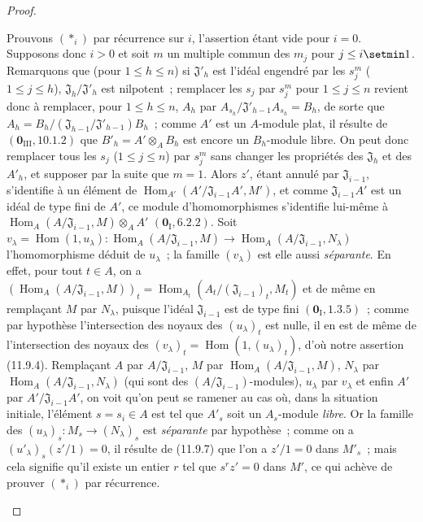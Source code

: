 \begin{proof}
\begin{enumerate}[label=(\roman*)]
  Prouvons $(*_i)$ par récurrence sur $i$, l'assertion étant vide pour $i=0$.
  Supposons donc $i>0$ et soit $m$ un multiple commun des $m_j$ pour
  $j\leq i\setmin 1$. Remarquons que (pour $1\leq h\leq n$) si
  $\mathfrak J'_h$ est l'idéal engendré par les $s_j^m$ ($1\leq j\leq h$),
  $\mathfrak J_h/\mathfrak J'_h$ est nilpotent~; remplacer les $s_j$ par
  $s_j^m$ pour $1\leq j\leq n$ revient donc à remplacer, pour
  $1\leq h\leq n$, $A_h$ par
  $A_{s_h}/\mathfrak J'_{h-1}A_{s_h}=B_h$, de sorte que
  $A_h=B_h/(\mathfrak J_{h-1}/\mathfrak J'_{h-1})B_h$~; comme $A'$ est un
  $A$-module plat, il résulte de $(\mathbf 0_{\mathrm{III}},10.1.2)$ que
  $B'_h=A'\otimes_A B_h$ est encore un $B_h$-module libre. On peut donc
  remplacer tous les $s_j$ ($1\leq j\leq n$) par $s_j^m$ sans changer les
  propriétés des $\mathfrak J_h$ et des $A'_h$, et supposer par la suite que
  $m=1$. Alors $z'$, étant annulé par $\mathfrak J_{i-1}$, s'identifie à un
  élément de
  $\operatorname{Hom}_{A'}(A'/\mathfrak J_{i-1}A',M')$, et comme
  $\mathfrak J_{i-1}A'$ est un idéal de type fini de $A'$, ce module
  d'homomorphismes s'identifie lui-même à
  $\operatorname{Hom}_A(A/\mathfrak J_{i-1},M)\otimes_A A'$
  $(\mathbf 0_{\mathrm I},6.2.2)$. Soit
  $v_\lambda=\operatorname{Hom}(1,u_\lambda):
  \operatorname{Hom}_A(A/\mathfrak J_{i-1},M)\longrightarrow
  \operatorname{Hom}_A(A/\mathfrak J_{i-1},N_\lambda)$
  l'homomorphisme déduit de $u_\lambda$~; la famille $(v_\lambda)$ est elle
  aussi \emph{séparante}. En effet, pour tout $t\in A$, on a
  $(\operatorname{Hom}_A(A/\mathfrak J_{i-1},M))_t
  =\operatorname{Hom}_{A_t}(A_t/(\mathfrak J_{i-1})_t,M_t)$
  et de même en remplaçant $M$ par $N_\lambda$, puisque l'idéal
  $\mathfrak J_{i-1}$ est de type fini $(\mathbf 0_{\mathrm I},1.3.5)$~;
  comme par hypothèse l'intersection des noyaux des $(u_\lambda)_t$ est nulle,
  il en est de même de l'intersection des noyaux des
  $(v_\lambda)_t=\operatorname{Hom}(1,(u_\lambda)_t)$, d'où notre assertion
  (11.9.4). Remplaçant $A$ par $A/\mathfrak J_{i-1}$, $M$ par
  $\operatorname{Hom}_A(A/\mathfrak J_{i-1},M)$, $N_\lambda$ par
  $\operatorname{Hom}_A(A/\mathfrak J_{i-1},N_\lambda)$ (qui sont des
  $(A/\mathfrak J_{i-1})$-modules), $u_\lambda$ par $v_\lambda$ et enfin $A'$
  par $A'/\mathfrak J_{i-1}A'$, on voit qu'on peut se ramener au cas où, dans
  la situation initiale, l'élément $s=s_i\in A$ est tel que $A'_s$ soit un
  $A_s$-module \emph{libre}. Or la famille des
  $(u_\lambda)_s:M_s\to(N_\lambda)_s$ est \emph{séparante} par hypothèse~; comme on a
  $(u'_\lambda)_s(z'/1)=0$, il résulte de (11.9.7) que l'on a $z'/1=0$ dans
  $M'_s$~; mais cela signifie qu'il existe un entier $r$ tel que $s^rz'=0$
  dans $M'$, ce qui achève de prouver $(*_i)$ par récurrence.
\end{enumerate}
\end{proof}

